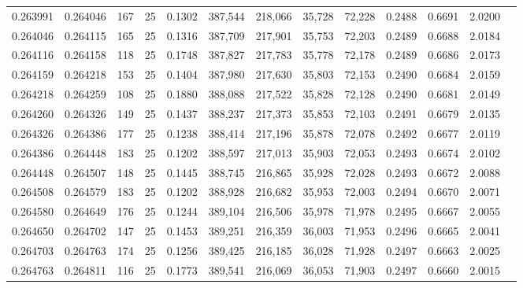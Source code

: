 \begin{tabular}{rrrrrrrrrrrrr}
0.263991 & 0.264046 &   167 &  25 &                                     0.1302 & 387,544 & 218,066 &  35,728 &  72,228 & 0.2488 & 0.6691 & 2.0200 \\
0.264046 & 0.264115 &   165 &  25 &                                     0.1316 & 387,709 & 217,901 &  35,753 &  72,203 & 0.2489 & 0.6688 & 2.0184 \\
0.264116 & 0.264158 &   118 &  25 &                                     0.1748 & 387,827 & 217,783 &  35,778 &  72,178 & 0.2489 & 0.6686 & 2.0173 \\
0.264159 & 0.264218 &   153 &  25 &                                     0.1404 & 387,980 & 217,630 &  35,803 &  72,153 & 0.2490 & 0.6684 & 2.0159 \\
0.264218 & 0.264259 &   108 &  25 &                                     0.1880 & 388,088 & 217,522 &  35,828 &  72,128 & 0.2490 & 0.6681 & 2.0149 \\
0.264260 & 0.264326 &   149 &  25 &                                     0.1437 & 388,237 & 217,373 &  35,853 &  72,103 & 0.2491 & 0.6679 & 2.0135 \\
0.264326 & 0.264386 &   177 &  25 &                                     0.1238 & 388,414 & 217,196 &  35,878 &  72,078 & 0.2492 & 0.6677 & 2.0119 \\
0.264386 & 0.264448 &   183 &  25 &                                     0.1202 & 388,597 & 217,013 &  35,903 &  72,053 & 0.2493 & 0.6674 & 2.0102 \\
0.264448 & 0.264507 &   148 &  25 &                                     0.1445 & 388,745 & 216,865 &  35,928 &  72,028 & 0.2493 & 0.6672 & 2.0088 \\
0.264508 & 0.264579 &   183 &  25 &                                     0.1202 & 388,928 & 216,682 &  35,953 &  72,003 & 0.2494 & 0.6670 & 2.0071 \\
0.264580 & 0.264649 &   176 &  25 &                                     0.1244 & 389,104 & 216,506 &  35,978 &  71,978 & 0.2495 & 0.6667 & 2.0055 \\
0.264650 & 0.264702 &   147 &  25 &                                     0.1453 & 389,251 & 216,359 &  36,003 &  71,953 & 0.2496 & 0.6665 & 2.0041 \\
0.264703 & 0.264763 &   174 &  25 &                                     0.1256 & 389,425 & 216,185 &  36,028 &  71,928 & 0.2497 & 0.6663 & 2.0025 \\
0.264763 & 0.264811 &   116 &  25 &                                     0.1773 & 389,541 & 216,069 &  36,053 &  71,903 & 0.2497 & 0.6660 & 2.0015 \\

\end{tabular}
